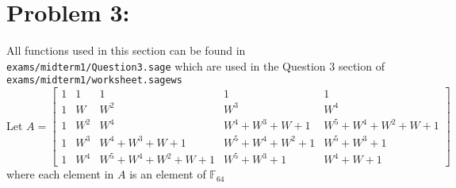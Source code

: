 \documentclass[12pt,letterpaper]{article}
\begin{document}
\section*{Problem 3:} 

    All functions used in this section can be found in \texttt{exams/midterm1/Question3.sage} which are used in the Question 3 section of \texttt{exams/midterm1/worksheet.sagews}
    \begin{equation*}
        \text{Let } A = 
        \begin{bmatrix}
            1   & 1     & 1                         & 1                     & 1\\
            1   & W     & W^2                       & W^3                   & W^4\\
            1   & W^2   & W^4                       & W^4 + W^3 + W + 1     & W^5 + W^4 + W^2 + W + 1\\
            1   & W^3   & W^4 + W^3 + W + 1         & W^5 + W^4 + W^2 + 1   & W^5 + W^3 + 1\\
            1   & W^4   & W^5 + W^4 + W^2  + W + 1  & W^5 + W^3 + 1         & W^4 + W + 1
        \end{bmatrix}
    \end{equation*}
    where each element in $A$ is an element of $\mathbb{F}_{64}$
\end{document}
